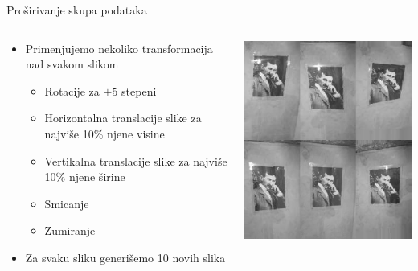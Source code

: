 \documentclass{beamer}
\begin{document}
\begin{frame}{Proširivanje skupa podataka}
    \begin{columns}
    \begin{column}{0.5\textwidth}
        \begin{itemize}
            \item Primenjujemo nekoliko transformacija nad svakom slikom
                \begin{itemize}
                    \item Rotacije za $\pm 5$ stepeni
                    \item Horizontalna translacije slike za najviše 10\% njene visine
                    \item Vertikalna translacije slike za najviše 10\% njene širine
                    \item Smicanje
                    \item Zumiranje
                \end{itemize}
            \item Za svaku sliku generišemo 10 novih slika
        \end{itemize}
    \end{column}
    \begin{column}{0.5\textwidth}  %
        \begin{center}
            \includegraphics[scale=0.5]{./slike/augmented_dataset.jpeg}
        \end{center}
    \end{column}
    \end{columns}
\end{frame}
\end{document}
